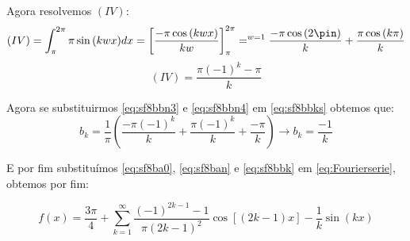 Agora resolvemos $(IV)$:
\begin{equation*}
    (IV) = \int_\pi^{2\pi} \pi \sin{(kwx)}dx = \left[\frac{-\pi\cos{(kwx)}}{kw}\right]^{2\pi}_\pi =^{w=1} \frac{-\pi\cos{(2\pin)}}{k} + \frac{\pi\cos{(k\pi)}}{k}
\end{equation*}
\begin{equation}
    \label{eq:sf8bbn4}
    (IV) = \frac{\pi(-1)^k - \pi}{k}
\end{equation}

Agora se substituirmos \ref{eq:sf8bbn3} e \ref{eq:sf8bbn4} em \ref{eq:sf8bbks} obtemos que:
\begin{equation}
    \label{eq:sf8bbk}
    b_k = \frac{1}{\pi}\left(\frac{-\pi(-1)^k}{k} + \frac{\pi(-1)^k}{k} + \frac{-\pi}{k}\right) \xrightarrow{} \boxed{b_k = \frac{-1}{k}}
\end{equation}

E por fim substituímos \ref{eq:sf8ba0}, \ref{eq:sf8ban} e \ref{eq:sf8bbk} em \ref{eq:Fourierserie}, obtemos por fim:

\begin{equation}
    \boxed{f(x) = \frac{3\pi}{4} + \sum^\infty_{k=1} \frac{(-1)^{2k-1} - 1}{\pi (2k-1)^2} \cos{[(2k-1)x]} - \frac{1}{k}\sin{(kx)} 
    }
\end{equation}